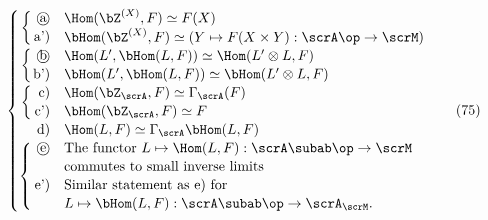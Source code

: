 \begin{equation}
  \label{eq:106.75}
  \left\{%
    \renewcommand*{\arraystretch}{1.1}%
    \begin{array}{@{}r@{}rl@{}}
      \left\{\rule{0pt}{3ex}\right. &
      \begin{tabular}{@{}r@{}}
        \textcircled{a} \\ 
        a')
      \end{tabular} &
      \begin{array}{@{}l@{}}
        \Hom(\bZ^{(X)},F)\simeq F(X) \\
        \bHom(\bZ^{(X)},F)\simeq (Y\mapsto F(X\times Y):\scrA\op\to\scrM)
      \end{array} \\
      \left\{\rule{0pt}{3ex}\right. &
      \begin{tabular}{@{}r@{}}
        \textcircled{b} \\
        b')
      \end{tabular} &
      \begin{array}{@{}l@{}}
        \Hom(L',\bHom(L,F)) \simeq \Hom(L'\otimes L,F) \\
        \bHom(L',\bHom(L,F)) \simeq \bHom(L'\otimes L,F)
      \end{array} \\
      \left\{\rule{0pt}{3ex}\right. &
      \begin{tabular}{@{}r@{}}
        c) \\
        c')
      \end{tabular} &
      \begin{array}{@{}l@{}}
        \Hom(\bZ_\scrA,F)\simeq\Gamma_\scrA(F) \\
        \bHom(\bZ_\scrA,F)\simeq F
      \end{array} \\
      & \text{d)} & \Hom(L,F)\simeq\Gamma_\scrA\bHom(L,F) \\
      \left\{\rule{0pt}{6ex}\right. &
      \begin{tabular}{@{}r@{}}
        \textcircled{e} \\
        $\phantom{()}$ \\
        e') \\
        $\phantom{()}$
      \end{tabular} &
      \begin{tabular}{@{}l@{}}
        The functor $L\mapsto\Hom(L,F):{\scrA\subab}\op\to\scrM$ \\
        commutes to small inverse limits \\
        Similar statement as e) for \\
        $L\mapsto\bHom(L,F):{\scrA\subab}\op\to\scrA_\scrM$.
      \end{tabular}
    \end{array}
  \right.\tag{75}
\end{equation}
